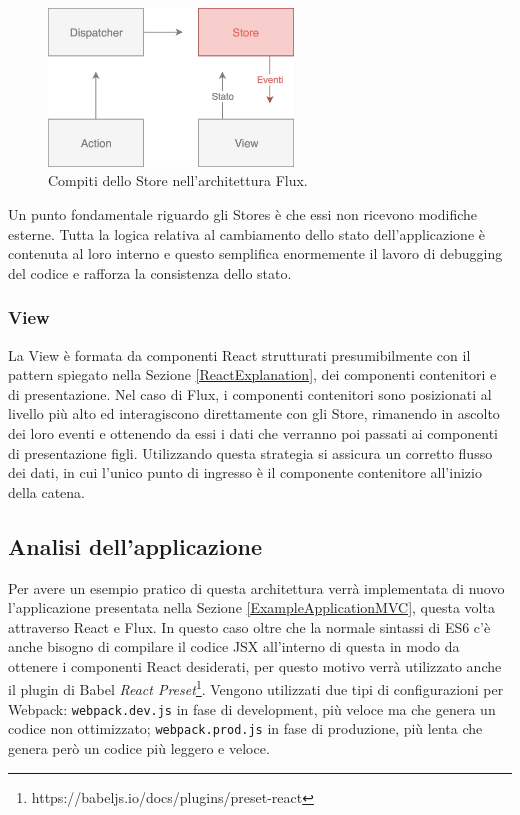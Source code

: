 \begin{figure}[h]
\centering
\vspace*{0.5cm} 
\includegraphics[width=6.5cm]{./images/StoreWorkflow}
\caption{Compiti dello Store nell'architettura Flux.}
\label{StoreWorkflow}
\vspace*{0.5cm} 
\end{figure}

Un punto fondamentale riguardo gli Stores è che essi non ricevono modifiche esterne. Tutta la logica relativa al cambiamento dello stato dell'applicazione è contenuta al loro interno e questo semplifica enormemente il lavoro di debugging del codice e rafforza la consistenza dello stato.

\subsubsection*{View}
La View è formata da componenti React strutturati presumibilmente con il pattern spiegato nella Sezione \ref{ReactExplanation}, dei componenti contenitori e di presentazione. Nel caso di Flux, i componenti contenitori sono posizionati al livello più alto ed interagiscono direttamente con gli Store, rimanendo in ascolto dei loro eventi e ottenendo da essi i dati che verranno poi passati ai componenti di presentazione figli.
Utilizzando questa strategia si assicura un corretto flusso dei dati, in cui l'unico punto di ingresso è il componente contenitore all'inizio della catena.

\subsection{Analisi dell'applicazione}
\label{FluxApplication}
Per avere un esempio pratico di questa architettura verrà implementata di nuovo l'applicazione presentata nella Sezione \ref{ExampleApplicationMVC}, questa volta attraverso React e Flux.
In questo caso oltre che la normale sintassi di ES6 c'è anche bisogno di compilare il codice JSX all'interno di questa in modo da ottenere i componenti React desiderati, per questo motivo verrà utilizzato anche il plugin di Babel \textit{React Preset}\footnote{https://babeljs.io/docs/plugins/preset-react}.
Vengono utilizzati due tipi di configurazioni per Webpack: \texttt{webpack.dev.js} in fase di development, più veloce ma che genera un codice non ottimizzato; \texttt{webpack.prod.js} in fase di produzione, più lenta che genera però un codice più leggero e veloce.

